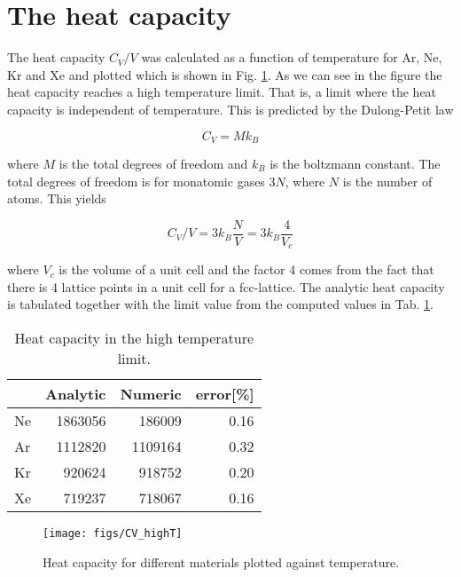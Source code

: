 \section{The heat capacity}

The heat capacity $C_V/V$ was calculated as a function of temperature for Ar, Ne, Kr and Xe and plotted which is shown in Fig. \ref{fig:heat}. As we can see in the figure the heat capacity reaches a high temperature limit. That is, a limit where the heat capacity is independent of temperature. This is predicted by the Dulong-Petit law

\begin{equation*}
  C_V = M k_B
\end{equation*}

where $M$ is the total degrees of freedom and $k_B$ is the boltzmann constant. The total degrees of freedom is for monatomic gases $3N$, where $N$ is the number of atoms. This yields

\begin{equation*}
  C_V / V = 3k_B \frac{N}{V} = 3k_B \frac{4}{V_c}
\end{equation*}

where $V_c$ is the volume of a unit cell and the factor 4 comes from the fact that there is 4 lattice points in a unit cell for a fcc-lattice. The analytic heat capacity is tabulated together with the limit value from the computed values in Tab. \ref{tab:heat}.

\begin{table}
\centering
  \caption{Heat capacity in the high temperature limit.}
  \label{tab:heat}
  \begin{tabular}{l|rrr}
    & Analytic & Numeric & error[\%] \\ \hline
    Ne & 1863056 & 186009 & 0.16\\
    Ar &  1112820 &  1109164 & 0.32\\
    Kr & 920624 &  918752 & 0.20\\
    Xe &  719237 & 718067 & 0.16
  \end{tabular}
\end{table}

\begin{figure}[H]
  \centering
  \texttt{[image: figs/CV\_highT]}
  \caption{Heat capacity for different materials plotted against temperature.}
  \label{fig:heat}
\end{figure}
